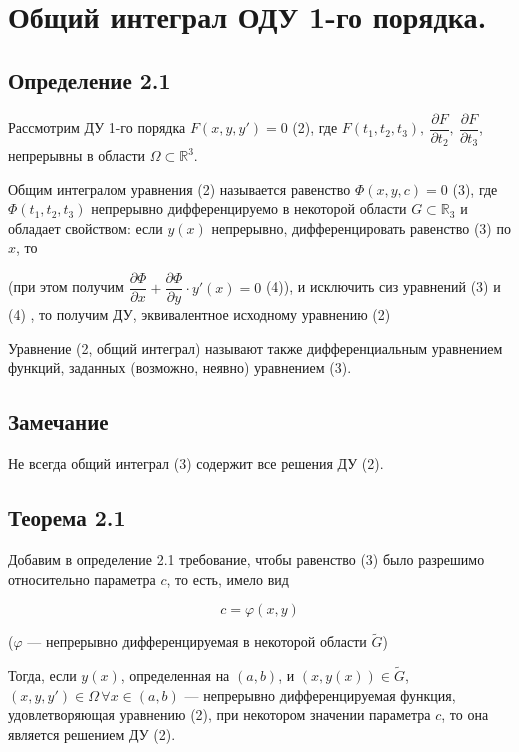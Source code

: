 {
	\section{Общий интеграл ОДУ 1-го порядка.}

	\subsection*{Определение 2.1}

	Рассмотрим ДУ 1-го порядка $F(x, y, y') = 0$ (2), где $F(t_1, t_2, t_3),\ \dfrac{\partial F}{\partial t_2},\ \dfrac{\partial F}{\partial t_3}$, непрерывны в области $\Omega \subset \mathbb{R}^3$.


	Общим интегралом уравнения (2) называется равенство $\Phi(x, y, c) = 0$ (3), где $\Phi(t_1, t_2, t_3)$ непрерывно дифференцируемо в некоторой области $G \subset \mathbb{R}_3$ и обладает свойством: если $y(x)$ непрерывно, дифференцировать равенство (3) по $x$, то

	(при этом получим $\dfrac{\partial \Phi}{\partial x} + \dfrac{\partial \Phi}{\partial y} \cdot y'(x) = 0$ (4)),  и исключить   сиз уравнений   (3)   и   (4) ,  то получим   ДУ,  эквивалентное исходному уравнению   (2)

	Уравнение   (2, общий интеграл)   называют также дифференциальным уравнением функций, заданных (возможно, неявно) уравнением   (3).

	\subsection*{Замечание}

	Не всегда общий интеграл (3) содержит все решения ДУ (2).

	\subsection*{Теорема 2.1}

	Добавим в определение 2.1 требование, чтобы равенство (3) было разрешимо относительно параметра $c$, то есть, имело вид


	\[
	c = \varphi(x, y) \tag{5}
	\]


	($\varphi$ — непрерывно дифференцируемая в некоторой области $\tilde{G}$)

	Тогда, если $y(x)$, определенная на $(a, b)$, и $(x, y(x)) \in \tilde{G}$, $(x, y, y')\in \Omega\, \forall x \in (a, b)$ — непрерывно дифференцируемая функция, удовлетворяющая уравнению (2), при некотором значении параметра $c$, то она является решением ДУ (2).

}
